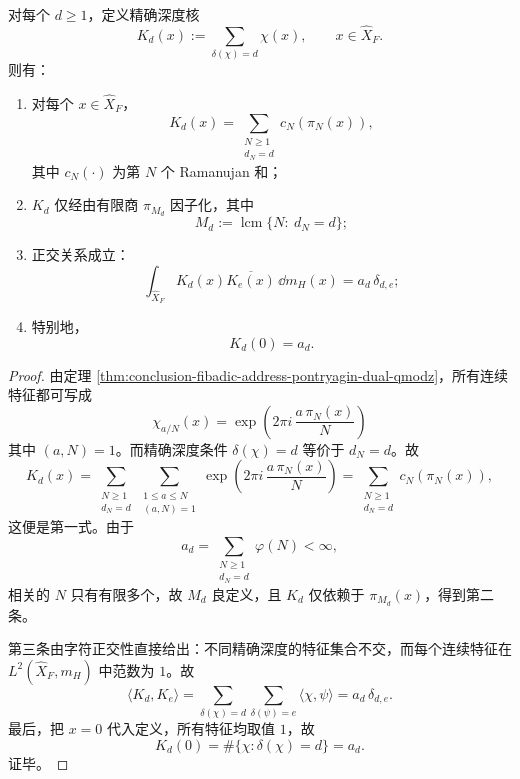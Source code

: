 \begin{theorem}\label{thm:conclusion-fibadic-exact-depth-kernel-ramanujan-packet}
对每个 \(d\ge 1\)，定义精确深度核
\[
K_d(x):=\sum_{\delta(\chi)=d}\chi(x),
\qquad x\in \widehat X_F.
\]
则有：
\begin{enumerate}
  \item 对每个 \(x\in \widehat X_F\)，
  \[
  K_d(x)
  =
  \sum_{\substack{N\ge 1\\ d_N=d}}
  c_N(\pi_N(x)),
  \]
  其中 \(c_N(\cdot)\) 为第 \(N\) 个 Ramanujan 和；
  \item \(K_d\) 仅经由有限商 \(\pi_{M_d}\) 因子化，其中
  \[
  M_d:=\operatorname{lcm}\{N:\ d_N=d\};
  \]
  \item 正交关系成立：
  \[
  \int_{\widehat X_F}K_d(x)\overline{K_e(x)}\,\dd m_H(x)
  =
  a_d\,\delta_{d,e};
  \]
  \item 特别地，
  \[
  K_d(0)=a_d.
  \]
\end{enumerate}
\end{theorem}
\begin{proof}
由定理 \ref{thm:conclusion-fibadic-address-pontryagin-dual-qmodz}，所有连续特征都可写成
\[
\chi_{a/N}(x)=\exp\!\left(2\pi i\,\frac{a\,\pi_N(x)}{N}\right)
\]
其中 \((a,N)=1\)。而精确深度条件 \(\delta(\chi)=d\) 等价于 \(d_N=d\)。故
\[
K_d(x)
=
\sum_{\substack{N\ge 1\\ d_N=d}}
\sum_{\substack{1\le a\le N\\ (a,N)=1}}
\exp\!\left(2\pi i\,\frac{a\,\pi_N(x)}{N}\right)
=
\sum_{\substack{N\ge 1\\ d_N=d}}
c_N(\pi_N(x)),
\]
这便是第一式。由于
\[
a_d=\sum_{\substack{N\ge 1\\ d_N=d}}\varphi(N)<\infty,
\]
相关的 \(N\) 只有有限多个，故 \(M_d\) 良定义，且 \(K_d\) 仅依赖于 \(\pi_{M_d}(x)\)，得到第二条。

第三条由字符正交性直接给出：不同精确深度的特征集合不交，而每个连续特征在 \(L^2(\widehat X_F,m_H)\) 中范数为 \(1\)。故
\[
\langle K_d,K_e\rangle
=
\sum_{\delta(\chi)=d}\sum_{\delta(\psi)=e}\langle \chi,\psi\rangle
=
a_d\,\delta_{d,e}.
\]
最后，把 \(x=0\) 代入定义，所有特征均取值 \(1\)，故
\[
K_d(0)=\#\{\chi:\delta(\chi)=d\}=a_d.
\]
证毕。
\end{proof}



